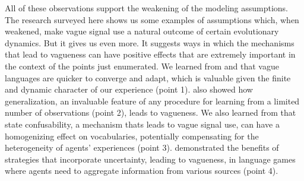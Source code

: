 \documentclass[a4paper]{article}
\begin{document}
All of these observations support the weakening of the modeling assumptions.
The research surveyed here shows us some examples of assumptions which, when weakened, make vague signal use a natural outcome of certain evolutionary dynamics.
But it gives us even more.
It suggests ways in which the mechanisms that lead to vagueness can have positive effects that are extremely important in the context of the points just enumerated.
We learned from \citeauthor{oconnor_evolution_2014} and \citeauthor{franke_vagueness_2017} that vague languages are quicker to converge and adapt, which is valuable given the finite and dynamic character of our experience (point 1).
\citeauthor{oconnor_evolving_2015} also showed how generalization, an invaluable feature of any procedure for learning from a limited number of observations (point 2), leads to vagueness.
We also learned from \citeauthor{franke_vagueness_2017} that state confusability, a mechanism thats leads to vague signal use, can have a homogenizing effect on vocabularies, potentially compensating for the heterogeneity of agents' experiences (point 3).
\citeauthor{lawry_vagueness_2017} demonstrated the benefits of strategies that incorporate uncertainty, leading to vagueness, in language games where agents need to aggregate information from various sources (point 4).
\end{document}
